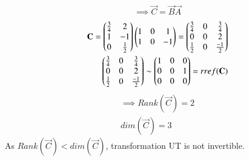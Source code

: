 \documentclass[journal,12pt,twocolumn]{IEEEtran}
\numberwithin{table}{section}
\begin{document}
\begin{enumerate}
\begin{align}
\implies \vec{C}=\vec{B}\vec{A}
\end{align}
\begin{align}
\mathbf{C}=\begin{pmatrix}\frac{3}{4}&2\\1&-1\\0&\frac{1}{2}\end{pmatrix}\begin{pmatrix}1&0&1\\1&0&-1\end{pmatrix}=\begin{pmatrix}\frac{3}{4}&0&\frac{3}{4}\\0&0&2\\\frac{1}{2}&0&\frac{-1}{2}\end{pmatrix}\\
\begin{pmatrix}\frac{3}{4}&0&\frac{3}{4}\\0&0&2\\\frac{1}{2}&0&\frac{-1}{2}\end{pmatrix} \sim \begin{pmatrix}1&0&0\\0&0&1\\0&0&0\end{pmatrix}=rref(\mathbf{C})
\end{align}
\begin{align}
\implies Rank(\vec{C})=2 \label{RankC}\\
dim(\vec{C})=3
\end{align}
As $Rank(\vec{C})<dim(\vec{C})$, transformation UT is not invertible.
\end{enumerate}
\end{document}
